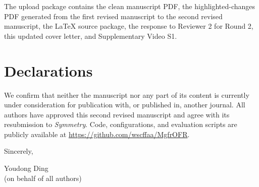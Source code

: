 \documentclass[11pt]{article}
\begin{document}
The upload package contains the clean manuscript PDF, the highlighted-changes PDF generated from the first revised manuscript to the second revised manuscript, the LaTeX source package, the response to Reviewer 2 for Round 2, this updated cover letter, and Supplementary Video S1.

\section*{Declarations}

We confirm that neither the manuscript nor any part of its content is currently under consideration for publication with, or published in, another journal. All authors have approved this second revised manuscript and agree with its resubmission to \emph{Symmetry}. Code, configurations, and evaluation scripts are publicly available at \url{https://github.com/wscffaa/MgfrOFR}.

Sincerely,

Youdong Ding \\
(on behalf of all authors)
\end{document}
